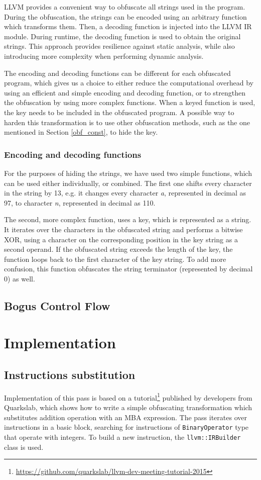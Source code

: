 \documentclass[
  digital, %
  table,   %
  twoside, %
  nolof,     %
  nolot,     %
]{fithesis3}
\theoremstyle{definition}
\begin{document}
LLVM provides a convenient way to obfuscate all strings used in the program. During the obfuscation, the strings can be encoded using an arbitrary function which transforms them. Then, a decoding function is injected into the LLVM IR module. During runtime, the decoding function is used to obtain the original strings. This approach provides resilience against static analysis, while also introducing more complexity when performing dynamic analysis. 

The encoding and decoding functions can be different for each obfuscated program, which gives us a choice to either reduce the computational overhead by using an efficient and simple encoding and decoding function, or to strengthen the obfuscation by using more complex functions. When a keyed function is used, the key needs to be included in the obfuscated program. A possible way to harden this transformation is to use other obfuscation methods, such as the one mentioned in Section \ref{obf_const}, to hide the key.

\subsection{Encoding and decoding functions}
For the purposes of hiding the strings, we have used two simple functions, which can be used either individually, or combined. The first one shifts every character in the string by 13, e.g. it changes every character \textit{a}, represented in decimal as 97, to character \textit{n}, represented in decimal as 110.

The second, more complex function, uses a key, which is represented as a string. It iterates over the characters in the obfuscated string and performs a bitwise XOR, using a character on the corresponding position in the key string as a second operand. If the obfuscated string exceeds the length of the key, the function loops back to the first character of the key string. To add more confusion, this function obfuscates the string terminator (represented by decimal 0) as well.

\section{Bogus Control Flow}

\chapter{Implementation}
\section{Instructions substitution}
Implementation of this pass is based on a tutorial\footnote{\url{https://github.com/quarkslab/llvm-dev-meeting-tutorial-2015}} published by developers from Quarkslab, which shows how to write a simple obfuscating transformation which substitutes addition operation with an MBA expression. 
The pass iterates over instructions in a basic block, searching for instructions of \texttt{BinaryOperator} type that operate with integers. To build a new instruction, the \texttt{llvm::IRBuilder} class is used. 
\end{document}
